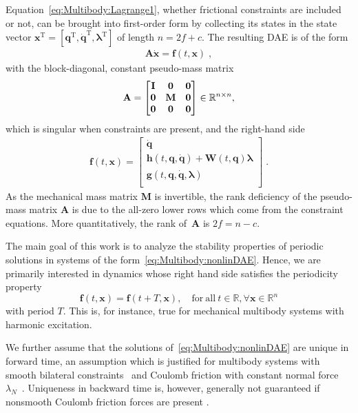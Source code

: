 \documentclass[a4paper, nonatbib, 3p, twocolumn]{elsarticle}
\theoremstyle{plain}
\theoremstyle{definition}
\theoremstyle{remark}
\newcommand{\T}{^{\mathop{\mathrm{T}}}}
\newcommand{\vzero}{\mathbf{0}}
\newcommand{\Rspace}{\mathbb{R}}
\newcommand{\vla}{\bm{\lambda}}
\newcommand{\vf}{\mathbf f}
\newcommand{\vg}{\mathbf g}
\newcommand{\vh}{\mathbf h}
\newcommand{\vq}{\mathbf q}
\newcommand{\vx}{\mathbf x}
\newcommand{\vA}{\mathbf A}
\newcommand{\vI}{\mathbf I}
\newcommand{\vM}{\mathbf M}
\newcommand{\vW}{\mathbf W}
\begin{document}
Equation~\eqref{eq:Multibody:Lagrange1}, whether frictional constraints are included or not, can be brought into first-order form by collecting its states in the state vector $\vx\T = [\vq\T, \dot{\vq}\T, \vla\T]$ of length $n = 2f + c$. The resulting DAE is of the form
\begin{align}\label{eq:Multibody:nonlinDAE}
    \vA \dot{\vx} = \vf(t, \vx) \;,
\end{align}
with the block-diagonal, constant pseudo-mass matrix
\begin{align}
    \vA = \begin{bmatrix}
    \vI & \vzero & \vzero \\ \vzero & \vM & \vzero \\ \vzero & \vzero & \vzero
    \end{bmatrix} \in \Rspace^{n\times n}\textnormal{,}
\end{align}
which is singular when constraints are present, and the right-hand side
\begin{align}
    \vf(t, \vx) = \begin{bmatrix}
    \dot{\vq} \\ 
    \vh(t, \vq, \dot{\vq}) + \vW(t, \vq) \vla\\ 
    \vg(t, \vq, \dot{\vq}, \vla) \\ 
    \end{bmatrix}\;.
\end{align}
As the mechanical mass matrix $\vM$ is invertible, the rank deficiency of the pseudo-mass matrix $\vA$ is due to the all-zero lower rows which come from the constraint equations. More quantitatively, the rank of~$\vA$ is $2f = n-c$. 

The main goal of this work is to analyze the stability properties of periodic solutions in systems of the form~\eqref{eq:Multibody:nonlinDAE}.
Hence, we are primarily interested in dynamics whose right hand side satisfies the periodicity property
\begin{equation}
    \vf(t, \vx) = \vf(t+T, \vx), \quad\mathrm{for~all~} t\in\Rspace, \forall \vx\in\Rspace^n
\end{equation}
 with period $T$.
This is, for instance, true for mechanical multibody systems with harmonic excitation.

We further assume that the solutions of~\eqref{eq:Multibody:nonlinDAE} are unique in forward time, an assumption which is justified for multibody systems with smooth bilateral constraints~\cite{Jalon1994} and Coulomb friction with constant normal force $\lambda_N$~\cite{Leine2004}. Uniqueness in backward time is, however, generally not guaranteed if nonsmooth Coulomb friction forces are present \cite{Leine2004}.
\end{document}
